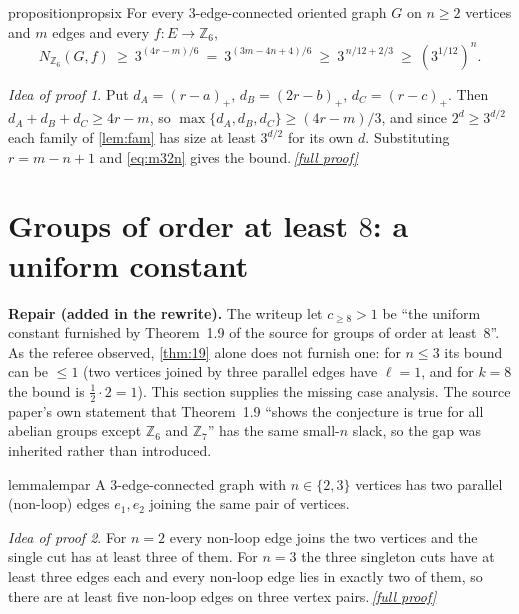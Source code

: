 \documentclass[11pt,a4paper]{article}
\theoremstyle{plain}
\theoremstyle{definition}
\theoremstyle{remark}
\newtheorem*{proofidea}{Idea of proof}
\newcommand{\fullproofref}[1]{\,\hyperref[#1]{\textit{[full proof]}}}
\newcommand{\Z}{{\mathbb Z}}
\newcommand{\Nf}{N}
\newcommand{\pos}[1]{(#1)_{+}}
\begin{document}
\begin{restatable}{proposition}{propsix}\label{prop:z6}
For every $3$-edge-connected oriented graph $G$ on $n\ge2$ vertices and $m$ edges and every $f\colon E\to\Z_6$,
\[
 \Nf_{\Z_6}(G,f)\ \ge\ 3^{(4r-m)/6}\ =\ 3^{(3m-4n+4)/6}\ \ge\ 3^{\,n/12+2/3}\ \ge\ (3^{1/12})^{n}.
\]
\end{restatable}
\begin{proofidea}
Put $d_A=\pos{r-a}$, $d_B=\pos{2r-b}$, $d_C=\pos{r-c}$. Then $d_A+d_B+d_C\ge4r-m$, so $\max\{d_A,d_B,d_C\}\ge(4r-m)/3$, and since $2^{d}\ge3^{d/2}$ each family of \cref{lem:fam} has size at least $3^{d/2}$ for its own $d$. Substituting $r=m-n+1$ and \eqref{eq:m32n} gives the bound.\fullproofref{pf:z6}
\end{proofidea}

\section{Groups of order at least \texorpdfstring{$8$}{8}: a uniform constant}\label{sec:large}

\begin{tcolorbox}[colback=blue!4,colframe=blue!40,boxrule=0.4pt,arc=2pt]
\small\textbf{Repair (added in the rewrite).} The writeup let $c_{\ge8}>1$ be ``the uniform constant furnished by Theorem~1.9 of the source for groups of order at least~$8$''. As the referee observed, \cref{thm:19} alone does not furnish one: for $n\le3$ its bound can be $\le1$ (two vertices joined by three parallel edges have $\ell=1$, and for $k=8$ the bound is $\frac12\cdot2=1$). This section supplies the missing case analysis. The source paper's own statement that Theorem~1.9 ``shows the conjecture is true for all abelian groups except $\Z_6$ and $\Z_7$'' has the same small-$n$ slack, so the gap was inherited rather than introduced.
\end{tcolorbox}

\begin{restatable}{lemma}{lempar}\label{lem:par}
A $3$-edge-connected graph with $n\in\{2,3\}$ vertices has two parallel (non-loop) edges $e_1,e_2$ joining the same pair of vertices.
\end{restatable}
\begin{proofidea}
For $n=2$ every non-loop edge joins the two vertices and the single cut has at least three of them. For $n=3$ the three singleton cuts have at least three edges each and every non-loop edge lies in exactly two of them, so there are at least five non-loop edges on three vertex pairs.\fullproofref{pf:par}
\end{proofidea}
\end{document}
